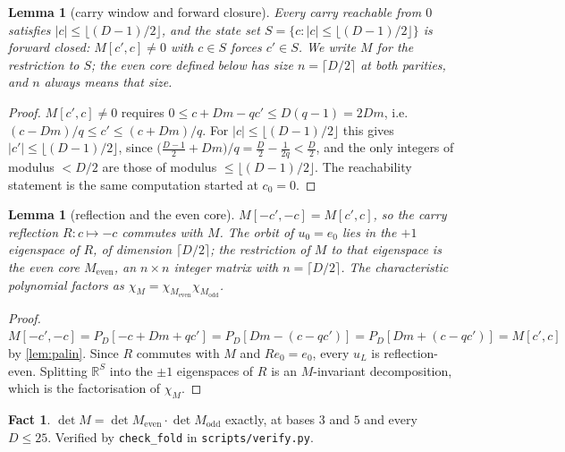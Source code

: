 \documentclass[11pt]{amsart}
\newtheorem{lemma}[theorem]{Lemma}
\theoremstyle{definition}
\newtheorem{fact}[theorem]{Fact}
\theoremstyle{remark}
\begin{document}
\begin{lemma}[carry window and forward closure]
\label{lem:window}
Every carry reachable from $0$ satisfies $\lvert c \rvert \le \lfloor (D-1)/2 \rfloor$, and the state set $S = \{c : \lvert c\rvert \le \lfloor (D-1)/2\rfloor\}$ is forward closed: $M[c',c] \ne 0$ with $c \in S$ forces $c' \in S$. We write $M$ for the restriction to $S$; the even core defined below has size $n = \lceil D/2 \rceil$ at both parities, and $n$ always means that size.
\end{lemma}

\begin{proof}
$M[c',c] \ne 0$ requires $0 \le c + Dm - qc' \le D(q-1) = 2Dm$, i.e. $(c-Dm)/q \le c' \le (c+Dm)/q$. For $\lvert c \rvert \le \lfloor (D-1)/2\rfloor$ this gives $\lvert c' \rvert \le \lfloor (D-1)/2 \rfloor$, since $\bigl(\tfrac{D-1}{2} + Dm\bigr)/q = \tfrac{D}{2} - \tfrac{1}{2q} < \tfrac{D}{2}$, and the only integers of modulus $< D/2$ are those of modulus $\le \lfloor (D-1)/2 \rfloor$. The reachability statement is the same computation started at $c_0 = 0$.
\end{proof}

\begin{lemma}[reflection and the even core]
\label{lem:core}
$M[-c',-c] = M[c',c]$, so the carry reflection $R: c \mapsto -c$ commutes with $M$. The orbit of $u_0 = e_0$ lies in the $+1$ eigenspace of $R$, of dimension $\lceil D/2 \rceil$; the restriction of $M$ to that eigenspace is the \emph{even core} $M_{\mathrm{even}}$, an $n \times n$ integer matrix with $n = \lceil D/2 \rceil$. The characteristic polynomial factors as $\chi_M = \chi_{M_{\mathrm{even}}}\chi_{M_{\mathrm{odd}}}$.
\end{lemma}

\begin{proof}
$M[-c',-c] = P_D[-c + Dm + qc'] = P_D[Dm - (c - qc')] = P_D[Dm + (c-qc')] = M[c',c]$ by \cref{lem:palin}. Since $R$ commutes with $M$ and $Re_0 = e_0$, every $u_L$ is reflection-even. Splitting $\mathbb{R}^S$ into the $\pm 1$ eigenspaces of $R$ is an $M$-invariant decomposition, which is the factorisation of $\chi_M$.
\end{proof}

\begin{fact}
\label{fact:fold}
$\det M = \det M_{\mathrm{even}} \cdot \det M_{\mathrm{odd}}$ exactly, at bases $3$ and $5$ and every $D \le 25$. Verified by \texttt{check\_fold} in \texttt{scripts/verify.py}.
\end{fact}
\end{document}
